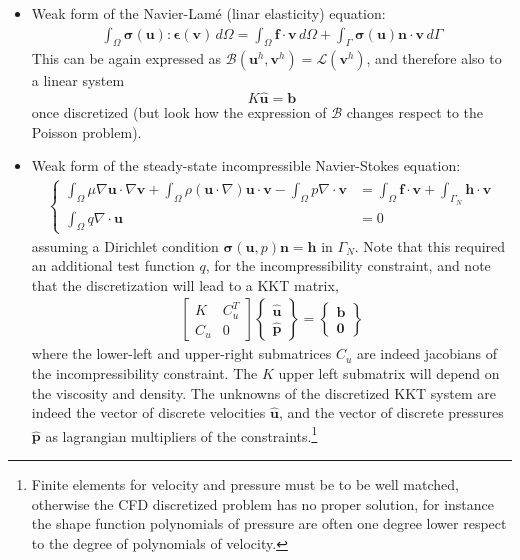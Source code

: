 \documentclass{digitaldynamics}
\def\vect#1{\bm{#1}}
\def\tensor#1{\bm{#1}}
\def\matr#1{{#1}}
\begin{document}
\begin{itemize}
	\item Weak form of the Navier-Lamé (linar elasticity) equation:
	\begin{align}
	\int_\Omega \tensor{\sigma}(\vect{u}) : \tensor{\epsilon}(\vect{v}) \,d\Omega = 
	 \int_\Omega \vect{f} \cdot \vect{v} \,d\Omega + 
	 \int_\Gamma \tensor{\sigma}(\vect{u}) \vect{n} \cdot \vect{v} \,d\Gamma   
	\end{align}
	This can be again expressed as $\mathcal{B}(\vect{u}^h,\vect{v}^h) = \mathcal{L}(\vect{v}^h)$, and therefore also to a linear system 
	\[
	\matr{K}\hat{\vect{u}}=\vect{b}
	\]
	once discretized (but look how the expression of $\mathcal{B}$ changes respect to the Poisson problem).
	
	
	\item Weak form of the steady-state incompressible Navier-Stokes equation:
	\begin{align}
	\left\{
	\begin{aligned}
   \int_{\Omega} \mu \nabla \boldsymbol u \cdot \nabla \boldsymbol v  + \int_{\Omega}\rho (\boldsymbol u \cdot \nabla) \boldsymbol u \cdot \boldsymbol v  
	- \int_{\Omega} p \nabla \cdot \boldsymbol v &= \int_{\Omega}\boldsymbol f \cdot \boldsymbol v +  \int_{\Gamma_N} \boldsymbol h \cdot \boldsymbol v\\
	\int_{\Omega} q \nabla \cdot \boldsymbol u &= 0 
	\end{aligned}
	\right.
	\end{align}
	assuming a Dirichlet condition $\tensor{\sigma}(\boldsymbol u, p) \boldsymbol{n} = \boldsymbol h$ in $\Gamma_N$.
	Note that this required an additional test function $q$, for the incompressibility constraint, and note that the discretization will lead to a KKT matrix, 
\begin{align*}
\begin{bmatrix}
	\matr{K} & \matr{C}_u^T \\
	\matr{C}_u  & \matr{0}
\end{bmatrix}
\begin{Bmatrix}
	\hat{\vect{u}} \\
	\hat{\vect{p}}
\end{Bmatrix}
=
\begin{Bmatrix}
	\vect{b} \\
	\vect{0}
\end{Bmatrix}
\end{align*}
%
	where the lower-left and upper-right submatrices $\matr{C}_u$ are indeed jacobians of the incompressibility constraint. The $K$ upper left submatrix will depend on the viscosity and density. The unknowns of the discretized KKT system are indeed the vector of discrete velocities $\hat{\vect{u}}$, and the vector of discrete pressures $\hat{\vect{p}}$ as lagrangian multipliers of the constraints.\footnote{Finite elements for velocity and pressure must be to be well matched, otherwise the CFD discretized problem has no proper solution, for instance the shape function polynomials of pressure are often one degree lower respect to the degree of polynomials of velocity.}


\end{itemize}
\end{document}
